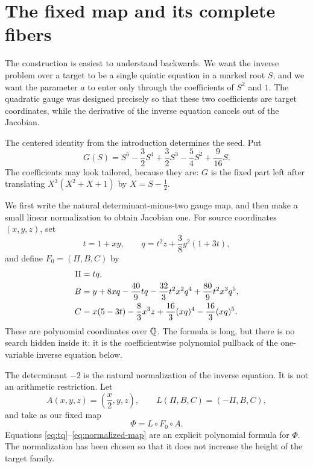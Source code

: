 \section{The fixed map and its complete fibers}\label{sec:fixed-map}

The construction is easiest to understand backwards.  We want the inverse
problem over a target to be a single quintic equation in a marked root
\(S\), and we want the parameter \(a\) to enter only through the
coefficients of \(S^2\) and \(1\).  The quadratic gauge was designed
precisely so that these two coefficients are target coordinates, while the
derivative of the inverse equation cancels out of the Jacobian.

The centered identity from the introduction determines the seed.  Put
\begin{equation}
 G(S)=S^5-\frac32S^4+\frac32S^3-\frac54S^2+\frac9{16}S.\label{eq:seed}
\end{equation}
The coefficients may look tailored, because they are: \(G\) is the fixed
part left after translating \(X^3(X^2+X+1)\) by \(X=S-\tfrac12\).

We first write the natural determinant-minus-two gauge map, and then make a
small linear normalization to obtain Jacobian one.  For source coordinates
\((x,y,z)\), set
\begin{equation}
 t=1+xy,\qquad
 q=t^2z+\frac38y^2(1+3t),\label{eq:tq}
\end{equation}
and define \(F_0=(\Pi,B,C)\) by
\begin{align}
 \Pi={}&tq,\notag\\
 B={}&y+8xq-\frac{40}{9}tq
       -\frac{32}{3}t^2x^2q^4
       +\frac{80}{9}t^2x^3q^5,\notag\\
 C={}&x(5-3t)-\frac83x^3z
       +\frac{16}{3}(xq)^4-\frac{16}{3}(xq)^5.\label{eq:base-map}
\end{align}
These are polynomial coordinates over \(\mathbb Q\).
The formula is long, but there is no search hidden inside it: it is the
coefficientwise polynomial pullback of the one-variable inverse equation
below.

The determinant \(-2\) is the natural normalization of the inverse
equation.  It is not an arithmetic restriction.  Let
\begin{equation}
 A(x,y,z)=\left(\frac{x}{2},y,z\right),
 \qquad
 L(\Pi,B,C)=(-\Pi,B,C),\label{eq:linear-normalization}
\end{equation}
and take as our fixed map
\begin{equation}
 \boxed{\Phi=L\circ F_0\circ A.}\label{eq:normalized-map}
\end{equation}
Equations \eqref{eq:tq}--\eqref{eq:normalized-map} are an explicit polynomial formula for
\(\Phi\).  The normalization has been chosen so that it does not increase
the height of the target family.

